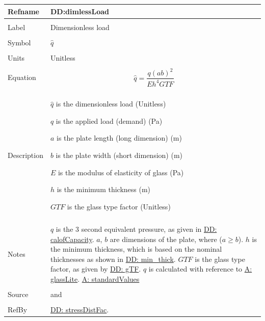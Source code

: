 \documentclass[12pt]{article}
\begin{document}
\noindent \begin{minipage}{\textwidth}
\begin{tabular}{p{} p{}}
\toprule \textbf{Refname} & \textbf{DD:dimlessLoad}
\label{DD:dimlessLoad}
\\ \midrule \\
Label & Dimensionless load
\\ \midrule \\
Symbol & $\hat{q}$
\\ \midrule \\
Units & Unitless
\\ \midrule \\
Equation & \begin{dmath}
           \hat{q}=\frac{q \left(a b\right)^{2}}{E h^{4} GTF}
           \end{dmath}
\\ \midrule \\
Description & \begin{symbDescription}
              \item{$\hat{q}$ is the dimensionless load (Unitless)}
              \item{$q$ is the applied load (demand) (Pa)}
              \item{$a$ is the plate length (long dimension) (m)}
              \item{$b$ is the plate width (short dimension) (m)}
              \item{$E$ is the modulus of elasticity of glass (Pa)}
              \item{$h$ is the minimum thickness (m)}
              \item{$GTF$ is the glass type factor (Unitless)}
              \end{symbDescription}
\\ \midrule \\
Notes & $q$ is the 3 second equivalent pressure, as given in \hyperref[DD:calofCapacity]{DD: calofCapacity}.
        $a$, $b$ are dimensions of the plate, where ($a\geq{}b$).
        $h$ is the minimum thickness, which is based on the nominal thicknesses as shown in \hyperref[DD:min.thick]{DD: min\_thick}.
        $GTF$ is the glass type factor, as given by \hyperref[DD:gTF]{DD: gTF}.
        $\hat{q}$ is calculated with reference to \hyperref[A:glassLite]{A: glassLite}.
        \hyperref[A:standardValues]{A: standardValues}
\\ \midrule \\
Source & \cite{astm2009} and \cite{campidelli}
\\ \midrule \\
RefBy & \hyperref[DD:stressDistFac]{DD: stressDistFac}.
\\ \bottomrule \end{tabular}
\end{minipage}\\
\end{document}
